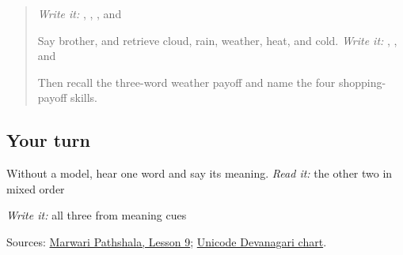 \label{lesson:MW-R13-shopping-close}



\begin{quote}
\emph{Write it:} \textbf{}, \textbf{}, \textbf{}, and \textbf{}

Say brother, and retrieve cloud, rain, weather, heat, and cold. \emph{Write it:} \textbf{}, \textbf{}, and \textbf{}

Then recall the three-word weather payoff and name the four shopping-payoff skills.
\end{quote}

\subsection*{Your turn}
Without a model, hear one word and say its meaning. \emph{Read it:} the other two in mixed order

\emph{Write it:} all three from meaning cues

\begin{tcolorbox}[breakable,colback=teal!4,colframe=teal!35!black,title={Before you move on}]
Sources: \href{https://www.marwaripathshala.com/marwari-lesson-9-english}{Marwari Pathshala, Lesson 9}; \href{https://www.unicode.org/charts/PDF/U0900.pdf}{Unicode Devanagari chart}.
\end{tcolorbox}
